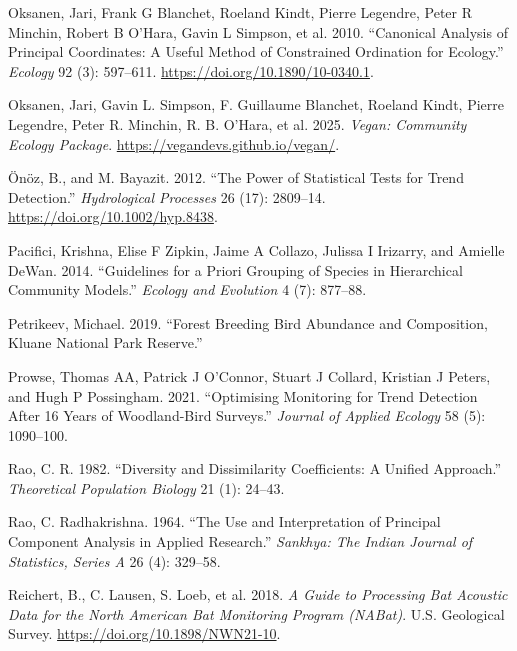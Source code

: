 \documentclass[
  letterpaper,
  DIV=11,
  numbers=noendperiod]{scrartcl}
\newlength{\cslhangindent}
\newenvironment{CSLReferences}[2] %
 {\begin{list}{}{%
  \setlength{\itemindent}{0pt}
  \setlength{\leftmargin}{0pt}
  \setlength{\parsep}{0pt}
  \ifodd #1
   \setlength{\leftmargin}{\cslhangindent}
   \setlength{\itemindent}{-1\cslhangindent}
  \fi
  \setlength{\itemsep}{#2\baselineskip}}}
 {\end{list}}
\begin{document}
\begin{CSLReferences}{1}{0}
Oksanen, Jari, Frank G Blanchet, Roeland Kindt, Pierre Legendre, Peter R
Minchin, Robert B O'Hara, Gavin L Simpson, et al. 2010. {``Canonical
Analysis of Principal Coordinates: A Useful Method of Constrained
Ordination for Ecology.''} \emph{Ecology} 92 (3): 597--611.
\url{https://doi.org/10.1890/10-0340.1}.

Oksanen, Jari, Gavin L. Simpson, F. Guillaume Blanchet, Roeland Kindt,
Pierre Legendre, Peter R. Minchin, R. B. O'Hara, et al. 2025.
\emph{Vegan: Community Ecology Package}.
\url{https://vegandevs.github.io/vegan/}.

Önöz, B., and M. Bayazit. 2012. {``The Power of Statistical Tests for
Trend Detection.''} \emph{Hydrological Processes} 26 (17): 2809--14.
\url{https://doi.org/10.1002/hyp.8438}.

Pacifici, Krishna, Elise F Zipkin, Jaime A Collazo, Julissa I Irizarry,
and Amielle DeWan. 2014. {``Guidelines for a Priori Grouping of Species
in Hierarchical Community Models.''} \emph{Ecology and Evolution} 4 (7):
877--88.

Petrikeev, Michael. 2019. {``Forest Breeding Bird Abundance and
Composition, Kluane National Park Reserve.''}

Prowse, Thomas AA, Patrick J O'Connor, Stuart J Collard, Kristian J
Peters, and Hugh P Possingham. 2021. {``Optimising Monitoring for Trend
Detection After 16 Years of Woodland-Bird Surveys.''} \emph{Journal of
Applied Ecology} 58 (5): 1090--100.

Rao, C. R. 1982. {``Diversity and Dissimilarity Coefficients: A Unified
Approach.''} \emph{Theoretical Population Biology} 21 (1): 24--43.

Rao, C. Radhakrishna. 1964. {``The Use and Interpretation of Principal
Component Analysis in Applied Research.''} \emph{Sankhya: The Indian
Journal of Statistics, Series A} 26 (4): 329--58.

Reichert, B., C. Lausen, S. Loeb, et al. 2018. \emph{A Guide to
Processing Bat Acoustic Data for the North American Bat Monitoring
Program (NABat)}. U.S. Geological Survey.
\url{https://doi.org/10.1898/NWN21-10}.


\end{CSLReferences}
\end{document}
